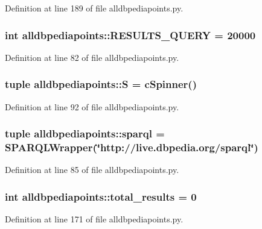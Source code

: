 \-Definition at line 189 of file alldbpediapoints.\-py.

\hypertarget{namespacealldbpediapoints_aa84c23bff204551129efc030239a1d30}{
\subsubsection[{\-R\-E\-S\-U\-L\-T\-S\-\_\-\-Q\-U\-E\-R\-Y}]{\setlength{\rightskip}{0pt plus 5cm}int {\bf alldbpediapoints\-::\-R\-E\-S\-U\-L\-T\-S\-\_\-\-Q\-U\-E\-R\-Y} = 20000}}\label{namespacealldbpediapoints_aa84c23bff204551129efc030239a1d30}


\-Definition at line 82 of file alldbpediapoints.\-py.

\hypertarget{namespacealldbpediapoints_ac1f9f39e29a7aedbcc64e9538f476a72}{
\subsubsection[{\-S}]{\setlength{\rightskip}{0pt plus 5cm}tuple {\bf alldbpediapoints\-::\-S} = {\bf c\-Spinner}()}}\label{namespacealldbpediapoints_ac1f9f39e29a7aedbcc64e9538f476a72}


\-Definition at line 92 of file alldbpediapoints.\-py.

\hypertarget{namespacealldbpediapoints_a7a4fa8530ce9061fe014924a1676e73d}{
\subsubsection[{sparql}]{\setlength{\rightskip}{0pt plus 5cm}tuple {\bf alldbpediapoints\-::sparql} = \-S\-P\-A\-R\-Q\-L\-Wrapper(\char`\"{}http\-://live.\-dbpedia.\-org/{\bf sparql}\char`\"{})}}\label{namespacealldbpediapoints_a7a4fa8530ce9061fe014924a1676e73d}


\-Definition at line 85 of file alldbpediapoints.\-py.

\hypertarget{namespacealldbpediapoints_ac0a3e9672828e3fea0d6d2aafa31b2da}{
\subsubsection[{total\-\_\-results}]{\setlength{\rightskip}{0pt plus 5cm}int {\bf alldbpediapoints\-::total\-\_\-results} = 0}}\label{namespacealldbpediapoints_ac0a3e9672828e3fea0d6d2aafa31b2da}


\-Definition at line 171 of file alldbpediapoints.\-py.

